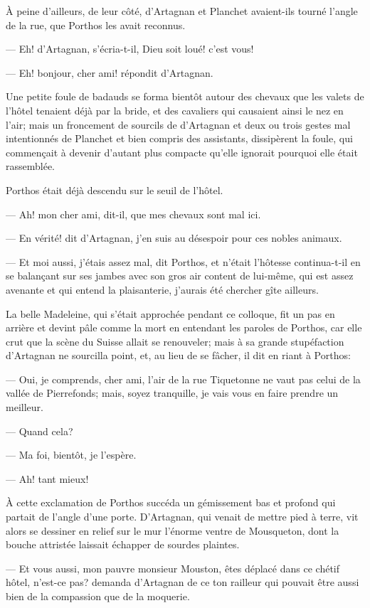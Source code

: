 À peine d'ailleurs, de leur côté, d'Artagnan et Planchet avaient-ils tourné l'angle de la rue, que Porthos les avait reconnus.

— Eh! d'Artagnan, s'écria-t-il, Dieu soit loué! c'est vous!

— Eh! bonjour, cher ami! répondit d'Artagnan.

Une petite foule de badauds se forma bientôt autour des chevaux que les valets de l'hôtel tenaient déjà par la bride, et des cavaliers qui causaient ainsi le nez en l'air; mais un froncement de sourcils de d'Artagnan et deux ou trois gestes mal intentionnés de Planchet et bien compris des assistants, dissipèrent la foule, qui commençait à devenir d'autant plus compacte qu'elle ignorait pourquoi elle était rassemblée.

Porthos était déjà descendu sur le seuil de l'hôtel.

— Ah! mon cher ami, dit-il, que mes chevaux sont mal ici.

— En vérité! dit d'Artagnan, j'en suis au désespoir pour ces nobles animaux.

— Et moi aussi, j'étais assez mal, dit Porthos, et n'était l'hôtesse continua-t-il en se balançant sur ses jambes avec son gros air content de lui-même, qui est assez avenante et qui entend la plaisanterie, j'aurais été chercher gîte ailleurs.

La belle Madeleine, qui s'était approchée pendant ce colloque, fit un pas en arrière et devint pâle comme la mort en entendant les paroles de Porthos, car elle crut que la scène du Suisse allait se renouveler; mais à sa grande stupéfaction d'Artagnan ne sourcilla point, et, au lieu de se fâcher, il dit en riant à Porthos:

— Oui, je comprends, cher ami, l'air de la rue Tiquetonne ne vaut pas celui de la vallée de Pierrefonds; mais, soyez tranquille, je vais vous en faire prendre un meilleur.

— Quand cela?

— Ma foi, bientôt, je l'espère.

— Ah! tant mieux!

À cette exclamation de Porthos succéda un gémissement bas et profond qui partait de l'angle d'une porte. D'Artagnan, qui venait de mettre pied à terre, vit alors se dessiner en relief sur le mur l'énorme ventre de Mousqueton, dont la bouche attristée laissait échapper de sourdes plaintes.

— Et vous aussi, mon pauvre monsieur Mouston, êtes déplacé dans ce chétif hôtel, n'est-ce pas? demanda d'Artagnan de ce ton railleur qui pouvait être aussi bien de la compassion que de la moquerie.

